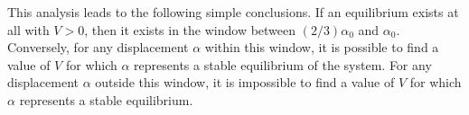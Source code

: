 \documentclass{revtex4}
\begin{document}
This analysis leads to the following simple conclusions. If an equilibrium
exists at all with $V>0$, then it exists in the window between $(2/3)\alpha_0$
and $\alpha_0$.  Conversely, for any displacement $\alpha$ within this
window, it is possible to find a value of $V$ for which $\alpha$ represents
a stable equilibrium of the system.  For any displacement $\alpha$ outside
this window, it is impossible to find a value of $V$ for which $\alpha$
represents a stable equilibrium.
\end{document}
